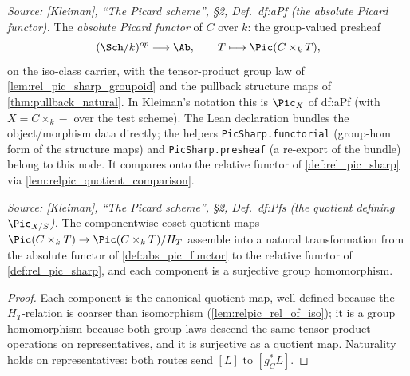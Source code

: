 \begin{definition}
  \label{def:abs_pic_functor}
  \textit{Source: [Kleiman], ``The Picard scheme'', \S 2, Def.~df:aPf
  (the absolute Picard functor).}
  The \emph{absolute Picard functor} of \(C\) over \(k\): the group-valued
  presheaf
  \[
    (\Sch/k)^{op} \longrightarrow \Ab, \qquad
    T \longmapsto \Pic(C \times_k T),
  \]
  on the iso-class carrier, with the tensor-product group law of
  \cref{lem:rel_pic_sharp_groupoid} and the pullback structure maps of
  \cref{thm:pullback_natural}. In Kleiman's notation this is \(\Pic_X\)
  of df:aPf (with \(X = C \times_k -\) over the test scheme). The Lean
  declaration bundles the object/morphism data directly; the helpers
  \texttt{PicSharp.functorial} (group-hom form of the structure maps) and
  \texttt{PicSharp.presheaf} (a re-export of the bundle) belong to this
  node. It compares onto the relative functor of \cref{def:rel_pic_sharp}
  via \cref{lem:relpic_quotient_comparison}.
\end{definition}

\begin{lemma}
  \label{lem:relpic_quotient_comparison}
  \textit{Source: [Kleiman], ``The Picard scheme'', \S 2, Def.~df:Pfs
  (the quotient defining \(\Pic_{X/S}\)).}
  The componentwise coset-quotient maps
  \(\Pic(C \times_k T) \to \Pic(C \times_k T)/H_T\) assemble into a natural
  transformation from the absolute functor of \cref{def:abs_pic_functor} to
  the relative functor of \cref{def:rel_pic_sharp}, and each
  component is a surjective group homomorphism.
\end{lemma}

\begin{proof}\leanok
  Each component is the canonical quotient map, well defined because the
  \(H_T\)-relation is coarser than isomorphism
  (\cref{lem:relpic_rel_of_iso}); it is a group homomorphism because both
  group laws descend the same tensor-product operations on representatives,
  and it is surjective as a quotient map. Naturality holds on
  representatives: both routes send \([L]\) to \([g_C^* L]\).
\end{proof}


